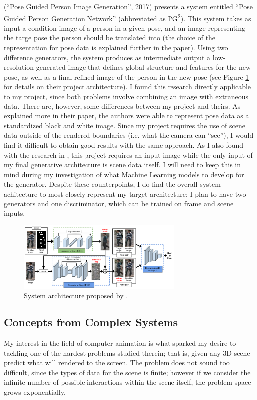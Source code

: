 \documentclass[conference]{IEEEtran}
\begin{document}
\cite{ref:pose_guided} (``Pose Guided Person Image Generation'', 2017)
presents a system entitled
``Pose Guided Person Generation Network'' (abbreviated as
PG\textsuperscript{2}). This system takes as input a condition image
of a person in a given pose, and an image representing the targe pose the person
should be translated into (the choice of the representation for pose data is explained further in the
paper). Using two difference generators,
the system produces as intermediate output a low-resolution generated
image that defines global structure and features for the new pose, as well as a final refined
image of the person in the new pose (see Figure \ref{fig:pose_guided} for
details on their project architecture). I found this research directly applicable
to my project, since both problems involve combining an image with extraneous data. There are, however,
some differences between my project and theirs. As explained more in their
paper, the authors were able to represent pose data as a standardized black and white image.
Since my project requires the use of scene data outside of the rendered
boundaries (i.e. what the camera can ``see''), I would find it difficult to
obtain good results with the same approach. As I also found with the research in
\cite{ref:spatiotemporal}, this project requires an input image while the only
input of my final generative architecture is scene data itself. I will need to
keep this in mind during my investigation of what Machine Learning models to
develop for the generator. Despite these counterpoints, I do find the overall
system achitecture to most closely represent my target architecture; I plan to
have two generators and one discriminator, which can be trained on frame and
scene inputs.

\begin{figure}[htbp]
\centerline{\includegraphics[width=8cm]{pose_guided.png}}
\caption{System architecture proposed by \cite{ref:pose_guided}.}
\label{fig:pose_guided}
\end{figure}

\subsection{Concepts from Complex Systems}
\label{subsec:complex_systems}
My interest in the field of computer animation is what sparked my desire to
tackling one of the hardest problems studied therein; that is, given any 3D scene
predict what will rendered to the screen. The problem does not sound too
difficult, since the types of data for the scene is finite; however if we
consider the infinite number of possible interactions within the scene itself,
the problem space grows exponentially.
\end{document}
